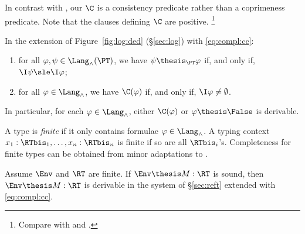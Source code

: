 \noindent
In contrast with \cite{abramsky91apal,bk03ic,ac98book},
our $\C$ is a consistency predicate rather than a coprimeness predicate.
Note that the clauses defining $\C$ are positive.%
\footnote{Compare with \cite[Figure 3]{bk03ic} and \cite[Figure 10.3]{ac98book}.}



\begin{proposition}
\label{prop:compl:fin:ded}
In the extension of Figure~\ref{fig:log:ded} (\S\ref{sec:log})
with \eqref{eq:compl:cc}:
\begin{enumerate}[(1)]
\item
for all $\varphi,\psi \in \Lang_\land(\PT)$,
we have
$\psi \thesis_\PT \varphi$
if, and only if,
$\I\psi \sle \I\varphi$;

\item
for all $\varphi \in \Lang_\land$,
we have
$\C(\varphi)$
if, and only if,
$\I\varphi \neq \emptyset$.
\end{enumerate}
\end{proposition}

\noindent
In particular, for each $\varphi \in \Lang_\land$,
either $\C(\varphi)$ or $\varphi \thesis \False$ is derivable.

A type is \emph{finite} if it only contains formulae $\varphi \in \Lang_\land$.
A typing context $x_1:\RTbis_1,\dots,x_n : \RTbis_n$
is finite if so are all $\RTbis_i$'s.
Completeness for finite types can be obtained
from minor adaptations to \cite{abramsky91apal}.

\begin{theorem}
\label{thm:compl:fin}
Assume $\Env$ and $\RT$ are finite.
If $\Env \thesis M : \RT$ is sound,
then $\Env \thesis M : \RT$ is derivable in the system of \S\ref{sec:reft}
extended with \eqref{eq:compl:cc}.
\end{theorem}



